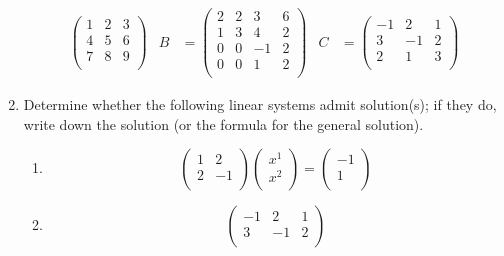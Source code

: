 \documentclass[../psets.tex]{subfiles}
\begin{document}
\begin{enumerate}
\begin{align*}
\begin{pmatrix}
            1 & 2 & 3\\
            4 & 5 & 6\\
            7 & 8 & 9\\
        \end{pmatrix}&
        B &=
        \begin{pmatrix}
            2 & 2 & 3 & 6\\
            1 & 3 & 4 & 2\\
            0 & 0 & -1 & 2\\
            0 & 0 & 1 & 2\\
        \end{pmatrix}&
        C &=
        \begin{pmatrix}
            -1 & 2 & 1\\
            3 & -1 & 2\\
            2 & 1 & 3\\
        \end{pmatrix}
    \end{align*}
    \item Determine whether the following linear systems admit solution(s); if they do, write down the solution (or the formula for the general solution).
    \begin{enumerate}
        \item 
        \begin{equation*}
            \begin{pmatrix}
                1 & 2\\
                2 & -1\\
            \end{pmatrix}
            \begin{pmatrix}
                x^1\\
                x^2\\
            \end{pmatrix}
            =
            \begin{pmatrix}
                -1\\
                1\\
            \end{pmatrix}
        \end{equation*}
        \item 
        \begin{equation*}
            \begin{pmatrix}
                -1 & 2 & 1\\
                3 & -1 & 2\\

\end{pmatrix}
\end{equation*}
\end{enumerate}
\end{enumerate}
\end{document}
